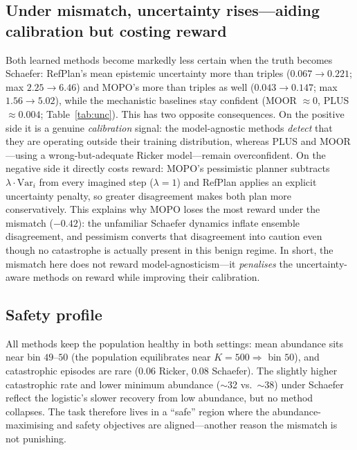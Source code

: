 \documentclass[11pt]{article}
\begin{document}
\subsection{Under mismatch, uncertainty rises---aiding calibration but costing reward}
\label{sec:pessimism}
Both learned methods become markedly less certain when the truth becomes Schaefer:
RefPlan's mean epistemic uncertainty more than triples ($0.067 \to 0.221$; max
$2.25 \to 6.46$) and MOPO's more than triples as well ($0.043 \to 0.147$; max
$1.56 \to 5.02$), while the mechanistic baselines stay confident (MOOR $\approx 0$,
PLUS $\approx 0.004$; Table~\ref{tab:unc}). This has two opposite consequences. On
the positive side it is a genuine \emph{calibration} signal: the model-agnostic
methods \emph{detect} that they are operating outside their training distribution,
whereas PLUS and MOOR---using a wrong-but-adequate Ricker model---remain
overconfident. On the negative side it directly costs reward: MOPO's pessimistic
planner subtracts $\lambda\cdot\mathrm{Var}_i$ from every imagined step
($\lambda=1$) and RefPlan applies an explicit uncertainty penalty, so greater
disagreement makes both plan more conservatively. This explains why MOPO loses the
most reward under the mismatch ($-0.42$): the unfamiliar Schaefer dynamics inflate
ensemble disagreement, and pessimism converts that disagreement into caution even
though no catastrophe is actually present in this benign regime. In short, the
mismatch here does not reward model-agnosticism---it \emph{penalises} the
uncertainty-aware methods on reward while improving their calibration.

\subsection{Safety profile}
All methods keep the population healthy in both settings: mean abundance sits near
bin $49$--$50$ (the population equilibrates near $K=500 \Rightarrow$ bin $50$),
and catastrophic episodes are rare ($0.06$ Ricker, $0.08$ Schaefer). The slightly
higher catastrophic rate and lower minimum abundance ($\sim$32 vs.\ $\sim$38)
under Schaefer reflect the logistic's slower recovery from low abundance, but no
method collapses. The task therefore lives in a ``safe'' region where the
abundance-maximising and safety objectives are aligned---another reason the
mismatch is not punishing.
\end{document}
